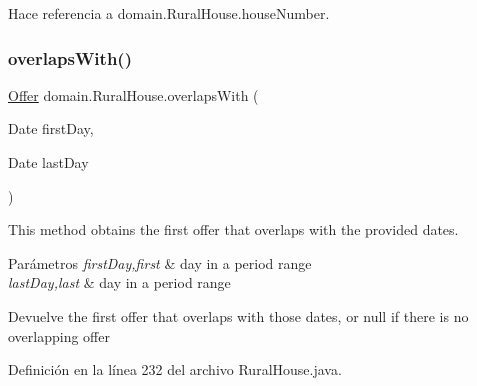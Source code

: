\begin{DoxyCode}{0}

\end{DoxyCode}


Hace referencia a domain.\+Rural\+House.\+house\+Number.

\mbox{\label{classdomain_1_1_rural_house_ac5596b06728d8bf377993088520fbc9e}} 
\subsubsection{\texorpdfstring{overlapsWith()}{overlapsWith()}}
{\footnotesize\ttfamily \mbox{\hyperlink{classdomain_1_1_offer}{Offer}} domain.\+Rural\+House.\+overlaps\+With (\begin{DoxyParamCaption}\item[{Date}]{first\+Day,  }\item[{Date}]{last\+Day }\end{DoxyParamCaption})}



This method obtains the first offer that overlaps with the provided dates. 


\begin{DoxyParams}{Parámetros}
{\em first\+Day,first} & day in a period range \\
\hline
{\em last\+Day,last} & day in a period range \\
\hline
\end{DoxyParams}
\begin{DoxyReturn}{Devuelve}
the first offer that overlaps with those dates, or null if there is no overlapping offer 
\end{DoxyReturn}


Definición en la línea 232 del archivo Rural\+House.\+java.


